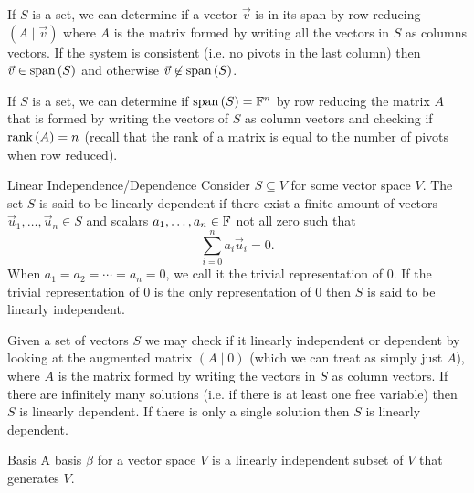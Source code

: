 \documentclass{exam}
\begin{document}
    If $S$ is a set, we can determine if a vector $\vec{v}$ is in its span by row reducing $(A \mid \vec{v})$ where $A$ is the matrix formed by writing all the vectors in $S$ as columns vectors. If the system is consistent (i.e. no pivots in the last column) then $\vec{v} \in \text{span}\left({S}\right)$ and otherwise $\vec{v} \not\in \text{span}\left({S}\right)$. 

    If $S$ is a set, we can determine if $\text{span}\left({S}\right) = \mathbb F^{n}$ by row reducing the matrix $A$ that is formed by writing the vectors of $S$ as column vectors and checking if $\text{rank}\left(A\right) = n$ (recall that the rank of a matrix is equal to the number of pivots when row reduced).

    \begin{defbox}{Linear Independence/Dependence}
        Consider $S \subseteq V$ for some vector space $V$. The set $S$ is said to be linearly dependent if there exist a finite amount of vectors $\vec{u}_1, \dots, \vec{u}_n \in S$ and scalars $a_1, \dots, a_n \in \mathbb F$ not all zero such that 
        \[
            \sum_{i=0}^{n} a_i\vec{u}_i = 0. 
        \]
        When $a_1 = a_2 = \cdots = a_n = 0$, we call it the trivial representation of $0$. If the trivial representation of $0$ is the only representation of $0$ then $S$ is said to be linearly independent.
    \end{defbox}

    Given a set of vectors $S$ we may check if it linearly independent or dependent by looking at the augmented matrix $(A \mid 0)$ (which we can treat as simply just $A$), where $A$ is the matrix formed by writing the vectors in $S$ as column vectors. If there are infinitely many solutions (i.e. if there is at least one free variable) then $S$ is linearly dependent. If there is only a single solution then $S$ is linearly dependent.

    \begin{defbox}{Basis}
        A basis $\beta$ for a vector space $V$ is a linearly independent subset of $V$ that generates $V$.
    \end{defbox}

    \newpage 
\end{document}
